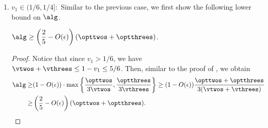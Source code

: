 \begin{enumerate}
\begin{proof}
        Adding \eqref{eqn:4a}, \eqref{eqn:4b}, \eqref{eqn:4c} and \eqref{eqn:4d}, we have that
        \[ 151\alg \ge (1-O(\epsilon))(32\opt_1 + 32\opt_2 + 32\opt_3 + 32\opt_L) = (32-O(\epsilon))\opt,\]
        and are done.
    \end{proof}

    






    
    



    \item $v_1 \in (1/6, 1/4]:$ Similar to the previous case, we first show the following lower bound on $\alg$.

    \begin{lemma}
    \label{lem:optgslbcase2}
        $\displaystyle\alg \ge \left(\frac{2}{5}-O(\epsilon)\right)(\opttwos+\optthrees)$.
    \end{lemma}
    \begin{proof}
        Notice that since $v_1>1/6$, we have $\vtwos+\vthrees \le 1-v_1\le 5/6$. Then, similar to the proof of , we obtain
        \begin{align*}
            \alg \ge& (1-O(\epsilon))\cdot \max\left\{\frac{\opttwos}{3\vtwos},\frac{\optthrees}{3\vthrees}\right\} \ge (1-O(\epsilon))\frac{\opttwos+\optthrees}{3(\vtwos+\vthrees)}\\ \ge& \left(\frac{2}{5}-O(\epsilon)\right)(\opttwos+\optthrees).
        \end{align*}
    \end{proof}


\end{enumerate}
